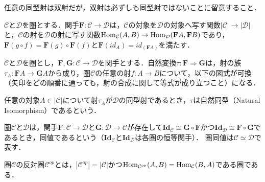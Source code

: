 \documentclass[type_judgement.tex]{subfiles}
\begin{document}
\begin{defn}[Category（圏）]
任意の同型射は双射だが，双射は必ずしも同型射ではないことに留意すること．

\begin{defn}[Functor（関手）]
$\mathcal{C}$と$\mathcal{D}$を圏とする．関手$\mathbf{F}:\mathcal{C} \rightarrow \mathcal{D}$は，$\mathcal{C}$の対象を$\mathcal{D}$の対象へ写す関数$|\mathcal{C}| \rightarrow |\mathcal{D}|$と，$\mathcal{C}$の射を$\mathcal{D}$の射に写す関数$\mathop{\mathrm{Hom}}\nolimits_\mathcal{C}(A,B) \rightarrow \mathop{\mathrm{Hom}}\nolimits_\mathcal{D}(\mathbf{F}A,\mathbf{F}B)$であり，
$\mathbf{F}(g \circ f) = \mathbf{F}(g) \circ \mathbf{F}(f)$と$\mathbf{F}(id_A) = id_{(\mathbf{F}A)}$を満たす．
\end{defn}



\begin{defn}
$\mathcal{C}$と$\mathcal{D}$を圏とし，$\mathbf{F},\mathbf{G}:\mathcal{C} \rightarrow \mathcal{D}$を関手とする．自然変換$\tau:\mathbf{F} \Rightarrow \mathbf{G}$は，射の族$\tau_A:\mathbf{F}A \rightarrow \mathbf{G}A$から成り，圏$\mathcal{C}$の任意の射$f:A \rightarrow B$について，以下の図式が可換（矢印をどの順番に通っても，射の合成に関して等式が成り立つこと）になる．
\begin{center}
\end{center}
任意の対象$A\in|\mathcal{C}|$について射$\tau_A$が$\mathcal{D}$の同型射であるとき，$\tau$は自然同型（Natural Isomorphism）であるという．
\end{defn}

\begin{defn}
圏$\mathcal{C}$と$\mathcal{D}$は，関手$\mathbf{F}:\mathcal{C} \rightarrow \mathcal{D}$と$\mathbf{G}:\mathcal{D} \rightarrow \mathcal{C}$が存在して$\mathbf{Id}_\mathcal{C} \cong \mathbf{G}\circ\mathbf{F}$かつ$\mathbf{Id}_\mathcal{D} \cong \mathbf{F}\circ\mathbf{G}$であるとき，同値であるという（$\mathbf{Id}_\mathcal{C}$と$\mathbf{Id}_\mathcal{D}$は各圏の恒等関手）．
圏同値は$\mathcal{C} \simeq \mathcal{D}$で表す．
\end{defn}

\begin{defn}
圏$\mathcal{C}$の反対圏$\mathcal{C}^{op}$とは，$|\mathcal{C}^{op}| = |\mathcal{C}|$かつ$\mathop{\mathrm{Hom}}\nolimits_{\mathcal{C}^{op}}(A,B) = \mathop{\mathrm{Hom}}\nolimits_\mathcal{C}(B,A)$である圏である．
\end{defn}


\end{defn}
\end{document}
